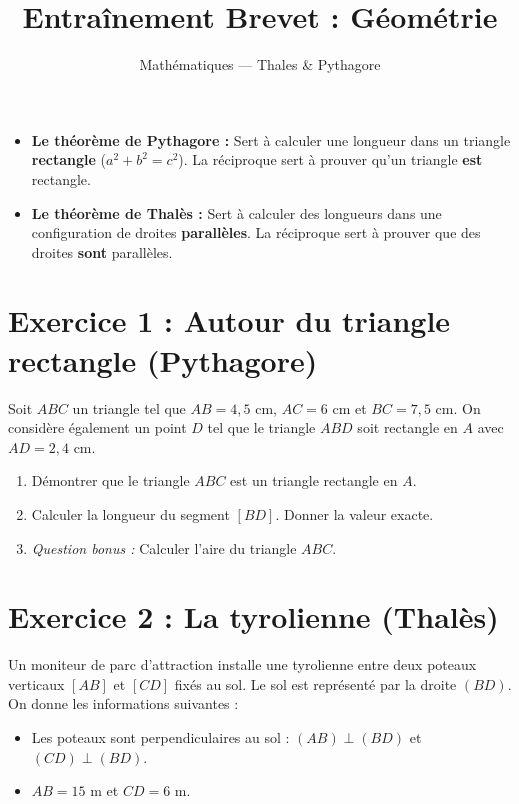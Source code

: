 \documentclass[11pt,a4paper]{article}
\title{\textbf{Entraînement Brevet : Géométrie}}
\author{Mathématiques --- Thales \& Pythagore}
\begin{document}
    \maketitle
    
    \begin{tcolorbox}[colback=blue!5!white,colframe=blue!75!black,title=Rappels de cours]
    \begin{itemize}
        \item \textbf{Le théorème de Pythagore :} Sert à calculer une longueur dans un triangle \textbf{rectangle} ($a^2 + b^2 = c^2$). La réciproque sert à prouver qu'un triangle \textbf{est} rectangle.
        \item \textbf{Le théorème de Thalès :} Sert à calculer des longueurs dans une configuration de droites \textbf{parallèles}. La réciproque sert à prouver que des droites \textbf{sont} parallèles.
    \end{itemize}
    \end{tcolorbox}
    
    \section*{Exercice 1 : Autour du triangle rectangle (Pythagore)}
    
    Soit $ABC$ un triangle tel que $AB = 4,5$ cm, $AC = 6$ cm et $BC = 7,5$ cm.
    On considère également un point $D$ tel que le triangle $ABD$ soit rectangle en $A$ avec $AD = 2,4$ cm.
    
    \begin{enumerate}
        \item Démontrer que le triangle $ABC$ est un triangle rectangle en $A$.
        \item Calculer la longueur du segment $[BD]$. Donner la valeur exacte.
        \item \textit{Question bonus :} Calculer l'aire du triangle $ABC$.
    \end{enumerate}
    
    \vspace{1cm}
    
    
    \section*{Exercice 2 : La tyrolienne (Thalès)}
    
        Un moniteur de parc d'attraction installe une tyrolienne entre deux poteaux verticaux $[AB]$ et $[CD]$ fixés au sol. Le sol est représenté par la droite $(BD)$.
        On donne les informations suivantes :
        \begin{itemize}
            \item Les poteaux sont perpendiculaires au sol : $(AB) \perp (BD)$ et $(CD) \perp (BD)$.
            \item $AB = 15$ m et $CD = 6$ m.
        \end{itemize}
        
\end{document}
